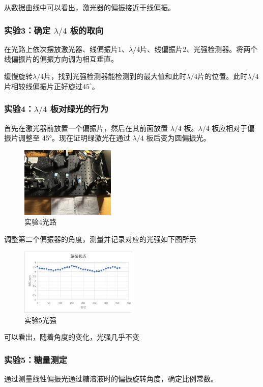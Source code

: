 \documentclass{ctexart}
\begin{document}
从数据曲线中可以看出，激光器的偏振接近于线偏振。

\subsubsection{实验3：确定 $\lambda/4$ 板的取向}
在光路上依次摆放激光器、线偏振片1、$\lambda/4$片、线偏振片2、光强检测器。将两个线偏振片的偏振方向调为相互垂直。

缓慢旋转$\lambda/4$片，找到光强检测器能检测到的最大值和此时$\lambda/4$片的位置。此时$\lambda/4$片相较线偏振片正好旋过$45^\circ$。
\subsubsection{实验4：$\lambda/4$ 板对绿光的行为}
首先在激光器前放置一个偏振片，然后在其前面放置 $\lambda/4$ 板。$\lambda/4$ 板应相对于偏振片调整至 45°。现在证明绿激光在通过 $\lambda/4$ 板后变为圆偏振光。
\begin{figure}[H]
    \centering
    \includegraphics[width=0.4\textwidth]{偏振光路.png}
    \caption{实验4光路}
\end{figure}
调整第二个偏振器的角度，测量并记录对应的光强如下图所示
\begin{figure}[H]
    \centering
    \includegraphics[width=0.5\textwidth]{实验5.png}
    \caption{实验5光强}
\end{figure}
可以看出，随着角度的变化，光强几乎不变

\subsubsection{实验5：糖量测定}
通过测量线性偏振光通过糖溶液时的偏振旋转角度，确定比例常数。
\end{document}
